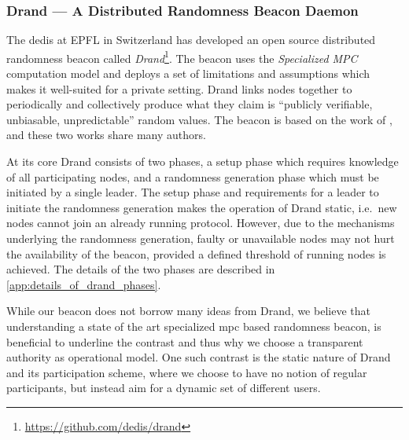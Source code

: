 \subsubsection{Drand --- A Distributed Randomness Beacon Daemon}%
\label{sub:drand_a_distributed_randomness_beacon_daemon}
The \gls{dedis} at EPFL in Switzerland has developed an open source distributed randomness beacon called \textit{Drand}\footnote{\url{https://github.com/dedis/drand}}.
The beacon uses the \textit{Specialized MPC} computation model and deploys a set of limitations and assumptions which makes it well-suited for a private setting.
Drand links nodes together to periodically and collectively produce what they claim is \enquote{publicly verifiable, unbiasable, unpredictable} random values.
The beacon is based on the work of \citet{syta2017scalable}, and these two works share many authors.

At its core Drand consists of two phases, a setup phase which requires knowledge of all participating nodes, and a randomness generation phase which must be initiated by a single leader.
The setup phase and requirements for a leader to initiate the randomness generation makes the operation of Drand static, i.e.\ new nodes cannot join an already running protocol.
However, due to the mechanisms underlying the randomness generation, faulty or unavailable nodes may not hurt the availability of the beacon, provided a defined threshold of running nodes is achieved.
The details of the two phases are described in \vref{app:details_of_drand_phases}.

While our beacon does not borrow many ideas from Drand, we believe that understanding a state of the art specialized \gls{mpc} based randomness beacon, is beneficial to underline the contrast and thus why we choose a transparent authority as operational model.
One such contrast is the static nature of Drand and its participation scheme, where we choose to have no notion of regular participants, but instead aim for a dynamic set of different users.

